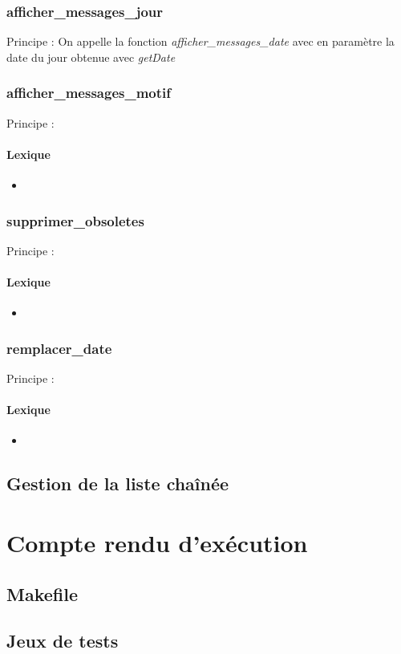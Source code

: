\documentclass{report}
\begin{document}
      \subsection{afficher\_messages\_jour}
Principe :
On appelle la fonction \textit{afficher\_messages\_date} avec en paramètre la date du jour obtenue avec \textit{getDate}
      
      \subsection{afficher\_messages\_motif}
Principe :
        
        \subsubsection{Lexique}
        \begin{itemize}
          \item 
        \end{itemize}
      
      \subsection{supprimer\_obsoletes}
Principe :

        \subsubsection{Lexique}
        \begin{itemize}
          \item 
        \end{itemize}

      \subsection{remplacer\_date}
Principe :

        \subsubsection{Lexique}
        \begin{itemize}
          \item 
        \end{itemize}      

    \section{Gestion de la liste chaînée}

  \chapter{Compte rendu d'exécution}
    \section{Makefile}

    \section{Jeux de tests}
\end{document}
